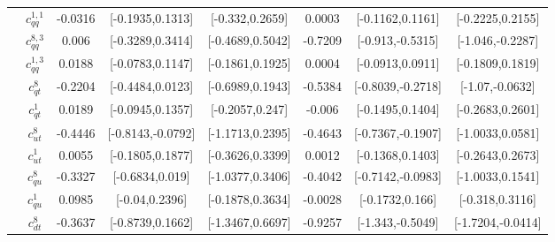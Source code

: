 \documentclass{article}
\begin{document}
\begin{table}[H]
\begin{tabular}{|c|c|c|c|c|c|c|c|}
 & $c_{qq}^{1,1}$ & -0.0316                             & [-0.1935,0.1313]                                 & [-0.332,0.2659] & 0.0003                             & [-0.1162,0.1161]                                 & [-0.2225,0.2155] \\ \cline{2-8}
 & $c_{qq}^{8,3}$ & 0.006                             & [-0.3289,0.3414]                                 & [-0.4689,0.5042] & -0.7209                             & [-0.913,-0.5315]                                 & [-1.046,-0.2287] \\ \cline{2-8}
 & $c_{qq}^{1,3}$ & 0.0188                             & [-0.0783,0.1147]                                 & [-0.1861,0.1925] & 0.0004                             & [-0.0913,0.0911]                                 & [-0.1809,0.1819] \\ \cline{2-8}
 & $c_{qt}^{8}$ & -0.2204                             & [-0.4484,0.0123]                                 & [-0.6989,0.1943] & -0.5384                             & [-0.8039,-0.2718]                                 & [-1.07,-0.0632] \\ \cline{2-8}
 & $c_{qt}^{1}$ & 0.0189                             & [-0.0945,0.1357]                                 & [-0.2057,0.247] & -0.006                             & [-0.1495,0.1404]                                 & [-0.2683,0.2601] \\ \cline{2-8}
 & $c_{ut}^{8}$ & -0.4446                             & [-0.8143,-0.0792]                                 & [-1.1713,0.2395] & -0.4643                             & [-0.7367,-0.1907]                                 & [-1.0033,0.0581] \\ \cline{2-8}
 & $c_{ut}^{1}$ & 0.0055                             & [-0.1805,0.1877]                                 & [-0.3626,0.3399] & 0.0012                             & [-0.1368,0.1403]                                 & [-0.2643,0.2673] \\ \cline{2-8}
 & $c_{qu}^{8}$ & -0.3327                             & [-0.6834,0.019]                                 & [-1.0377,0.3406] & -0.4042                             & [-0.7142,-0.0983]                                 & [-1.0033,0.1541] \\ \cline{2-8}
 & $c_{qu}^{1}$ & 0.0985                             & [-0.04,0.2396]                                 & [-0.1878,0.3634] & -0.0028                             & [-0.1732,0.166]                                 & [-0.318,0.3116] \\ \cline{2-8}
 & $c_{dt}^{8}$ & -0.3637                             & [-0.8739,0.1662]                                 & [-1.3467,0.6697] & -0.9257                             & [-1.343,-0.5049]                                 & [-1.7204,-0.0414] \\ \cline{2-8}

\end{tabular}
\end{table}
\end{document}
